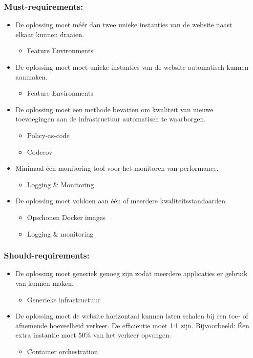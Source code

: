\subsubsection{Must-requirements:}
\begin{itemize}
	\item De oplossing moet méér dan twee unieke instanties van de website naast elkaar kunnen draaien.
	\begin{itemize}
		\item Feature Environments
	\end{itemize}
	
	\item De oplossing moet moet unieke instanties van de website automatisch kunnen aanmaken.
	\begin{itemize}
		\item Feature Environments
	\end{itemize}

	\item De oplossing moet een methode bevatten om kwaliteit van nieuwe toevoegingen aan de infrastructuur automatisch te waarborgen.
	\begin{itemize}
		\item Policy-as-code
		\item Codecov
	\end{itemize}

	\item Minimaal één monitoring tool voor het monitoren van performance.
	\begin{itemize}
		\item Logging \& Monitoring
	\end{itemize}

	\item De oplossing moet voldoen aan één of meerdere kwaliteitsstandaarden.
	\begin{itemize}
		\item Opschonen Docker images
		\item Logging \& monitoring
	\end{itemize}
\end{itemize}

\subsubsection{Should-requirements:}
\begin{itemize}
	\item De oplossing moet generiek genoeg zijn zodat meerdere applicaties er gebruik van kunnen maken.
	\begin{itemize}
		\item Generieke infrastructuur
	\end{itemize}

	\item De oplossing moet de website horizontaal kunnen laten schalen bij een toe- of afnemende hoeveelheid verkeer. De efficiëntie moet 1:1 zijn. Bijvoorbeeld: Éen extra instantie moet 50\% van het verkeer opvangen.
	\begin{itemize}
		\item Container orchestration
	\end{itemize}
\end{itemize}

